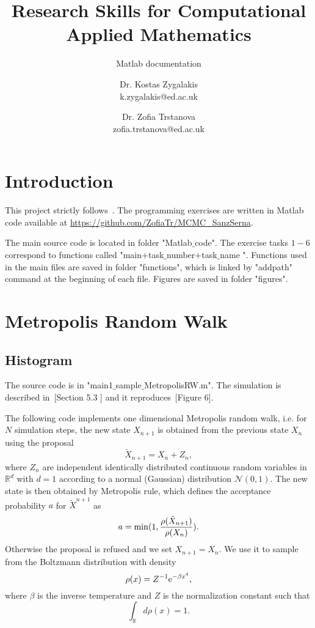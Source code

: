 \documentclass{scrartcl}
\title{Research Skills for Computational Applied Mathematics}
\subtitle{Matlab documentation}
\newcommand{\R}{\mathbb{R}}
\begin{document}
\begin{titlepage}
\author{Dr. Kostas Zygalakis\\ k.zygalakis@ed.ac.uk
\and 
Dr. Zofia Trstanova\\zofia.trstanova@ed.ac.uk}


\clearpage\maketitle
\thispagestyle{empty}
\end{titlepage}

\newpage
\setcounter{page}{1}

\section{Introduction}
This project strictly follows~\cite{sanz2014markov}. The programming exercises are written in Matlab code available at \url{https://github.com/ZofiaTr/MCMC_SanzSerna}.

The main source code is located in folder "Matlab$\_$code". The exercise tasks $1-6$ correspond to functions called "main$+$task$\_$number$+$task$\_$name ". Functions used in the main files are saved in folder "functions", which is linked by "addpath" command at the beginning of each file. Figures are saved in folder "figures".

\section{Metropolis Random Walk}

\subsection{Histogram}
The source code is in "main1$\_$sample$\_$MetropolisRW.m". The simulation is described in~\cite{sanz2014markov}[Section 5.3 ] and it reproduces~\cite{sanz2014markov}[Figure 6].

The following code implements one dimensional Metropolis random walk, i.e. for $N$ simulation steps, the new state $X_{n+1}$ is obtained from the previous state $X_{n}$ using the proposal
\[
\tilde{X}_{n+1} = X_n + Z_n,
\]
where $Z_n$ are independent identically distributed continuous random variables in $\R^d$ with $d=1$ according to a normal (Gaussian) distribution $\mathcal{N}(0,1)$. The new state is then obtained by Metropolis rule, which defines the acceptance probability $a$ for $\tilde{X}^{n+1}$ as
\[
a  = {\rm min}(1, \frac{\rho(\tilde{X}_{n+1})}{\rho(X_n)}).
\]
Otherwise the proposal is refused and we set $X_{n+1}=X_{n}$. 
We use it to sample from the Boltzmann distribution with density
\[
\rho(x) = Z^{-1}{\rm e}^{-\beta x^4},
\]
where $\beta$ is the inverse temperature and $Z$ is the normalization constant such that
\[
\int_{\R} d\rho(x) = 1.
\]
\end{document}
